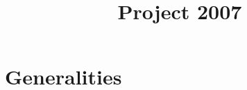 \newcommand{\UNCLEAR}{}
\newcommand{\ISITCLEAR}{}
\newcommand{\PPP}{MMVII}

\newcommand{\MmVii}
{
\ensuremath{ \mbox{
     {\bf $\mathcal{M}$}\hspace{-0.15em}\raisebox{-0.4ex}{$m$}\hspace{-0.3em}\raisebox{0.3ex}{$V$}\raisebox{-0.4ex}{$2$}
}}}

\newcommand{\CdPPP}{{\tt MMVII}}
\newcommand{\MMVIDIR}{{\tt MMVII-MainFolder/}}
\newcommand{\doxy}{\emph{doxygen}}
\newcommand{\MMNONE}{NONE}

\newcommand{\AttrV}{A_V}
\newcommand{\AttrEOr}{A_{\vec{e}}}
\newcommand{\AttrESym}{A_{\overline{E}}}

\newcommand{\ObjGr}[1]{\ensuremath #1<\AttrV,\AttrEOr,\AttrESym>}

\newcommand{\GrEdg}[2]{\ensuremath \overrightarrow{#1 #2}}
\newcommand{\GrEdgAB}{\GrEdg{v_1}{v_2}}
\newcommand{\GrEdgBA}{\GrEdg{v_2}{v_1}}

%
%
%



\title{Project 2007}

\maketitle

\tableofcontents



\part{Generalities}

